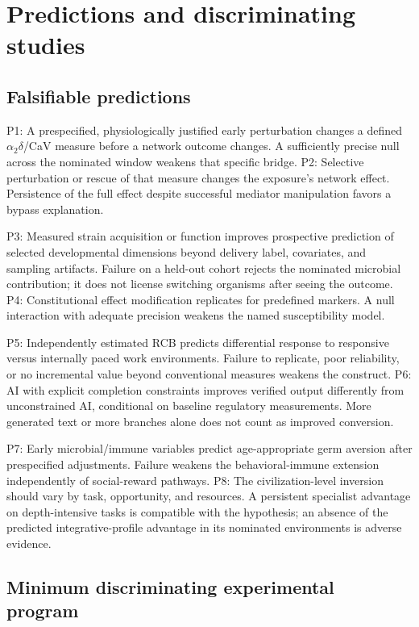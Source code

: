 \section{Predictions and discriminating studies}

\subsection{Falsifiable predictions}

P1: A prespecified, physiologically justified early perturbation changes a defined \ensuremath{\alpha_2\delta}/CaV measure before a network outcome changes. A sufficiently precise null across the nominated window weakens that specific bridge. P2: Selective perturbation or rescue of that measure changes the exposure's network effect. Persistence of the full effect despite successful mediator manipulation favors a bypass explanation.

P3: Measured strain acquisition or function improves prospective prediction of selected developmental dimensions beyond delivery label, covariates, and sampling artifacts. Failure on a held-out cohort rejects the nominated microbial contribution; it does not license switching organisms after seeing the outcome. P4: Constitutional effect modification replicates for predefined markers. A null interaction with adequate precision weakens the named susceptibility model.

P5: Independently estimated RCB predicts differential response to responsive versus internally paced work environments. Failure to replicate, poor reliability, or no incremental value beyond conventional measures weakens the construct. P6: AI with explicit completion constraints improves verified output differently from unconstrained AI, conditional on baseline regulatory measurements. More generated text or more branches alone does not count as improved conversion.

P7: Early microbial/immune variables predict age-appropriate germ aversion after prespecified adjustments. Failure weakens the behavioral-immune extension independently of social-reward pathways. P8: The civilization-level inversion should vary by task, opportunity, and resources. A persistent specialist advantage on depth-intensive tasks is compatible with the hypothesis; an absence of the predicted integrative-profile advantage in its nominated environments is adverse evidence.


\subsection{Minimum discriminating experimental program}

